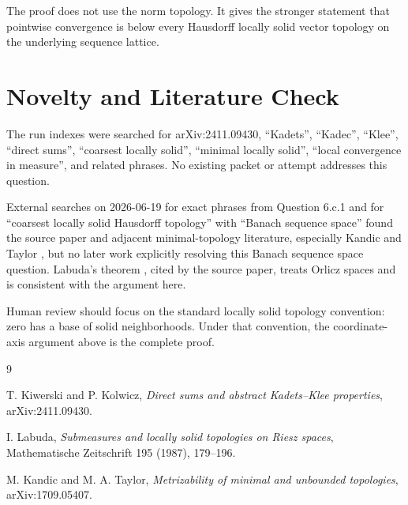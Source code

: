 \documentclass[11pt]{article}
\begin{document}
The proof does not use the norm topology.  It gives the stronger statement
that pointwise convergence is below every Hausdorff locally solid vector
topology on the underlying sequence lattice.

\section*{Novelty and Literature Check}

The run indexes were searched for arXiv:2411.09430, ``Kadets'', ``Kadec'',
``Klee'', ``direct sums'', ``coarsest locally solid'', ``minimal locally
solid'', ``local convergence in measure'', and related phrases.  No existing
packet or attempt addresses this question.

External searches on 2026-06-19 for exact phrases from Question 6.c.1 and for
``coarsest locally solid Hausdorff topology'' with ``Banach sequence space''
found the source paper and adjacent minimal-topology literature, especially
Kandic and Taylor \cite{KT}, but no later work explicitly resolving this
Banach sequence space question.  Labuda's theorem \cite{Labuda}, cited by the
source paper, treats Orlicz spaces and is consistent with the argument here.

Human review should focus on the standard locally solid topology convention:
zero has a base of solid neighborhoods.  Under that convention, the
coordinate-axis argument above is the complete proof.

\begin{thebibliography}{9}

T. Kiwerski and P. Kolwicz,
\emph{Direct sums and abstract Kadets--Klee properties},
arXiv:2411.09430.

I. Labuda,
\emph{Submeasures and locally solid topologies on Riesz spaces},
Mathematische Zeitschrift 195 (1987), 179--196.

M. Kandic and M. A. Taylor,
\emph{Metrizability of minimal and unbounded topologies},
arXiv:1709.05407.

\end{thebibliography}
\end{document}
